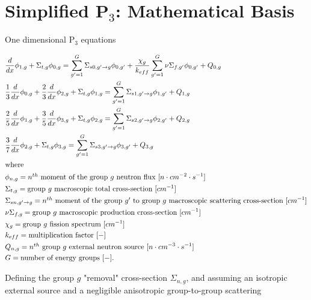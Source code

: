 \documentclass[letterpaper]{article}
\begin{document}
\section{Simplified P$_3$: Mathematical Basis}

One dimensional P$_3$ equations
\cite{brantley_simplifiedP3_2000}

\begin{align}
    & \frac{d}{dx} \phi_{1,g} + \Sigma_{t,g} \phi_{0,g} = \sum_{g'=1}^G \Sigma_{s0,g' \rightarrow g} \phi_{0,g'} + \frac{\chi_g}{k_{eff}} \sum_{g'=1}^G \nu\Sigma_{f,g'} \phi_{0,g'} + Q_{0,g}  \label{eq:SP3-0} \\
    & \frac{1}{3} \frac{d}{dx} \phi_{0,g} + \frac{2}{3}\frac{d}{dx}\phi_{2,g} + \Sigma_{t,g} \phi_{1,g} = \sum_{g'=1}^G \Sigma_{s1,g' \rightarrow g} \phi_{1,g'} + Q_{1,g} \label{eq:SP3-1} \\
    & \frac{2}{5} \frac{d}{dx}\phi_{1,g} + \frac{3}{5}\frac{d}{dx}\phi_{3,g} + \Sigma_{t,g} \phi_{2,g} = \sum_{g'=1}^G \Sigma_{s2,g' \rightarrow g} \phi_{2,g'} + Q_{2,g} \label{eq:SP3-2} \\
    & \frac{3}{7}\frac{d}{dx}\phi_{2,g} + \Sigma_{t,g} \phi_{3,g} = \sum_{g'=1}^G \Sigma_{s3,g' \rightarrow g} \phi_{3,g'} + Q_{3,g} \label{eq:P3-3} \\
    \intertext{where}
    & \phi_{n,g} = \mbox{$n^{th}$ moment of the group $g$ neutron flux } [n \cdot cm^{-2} \cdot s^{-1}]  \notag \\
    & \Sigma_{t,g} = \mbox{group $g$ macroscopic total cross-section } [cm^{-1}]  \notag \\
	& \Sigma_{sn,g' \rightarrow g} = \mbox{$n^{th}$ moment of the group $g'$ to group $g$ macroscopic scattering cross-section } [cm^{-1}]  \notag \\
	& \nu\Sigma_{f,g} = \mbox{group $g$ macroscopic production cross-section } [cm^{-1}]  \notag \\
	& \chi_{g} = \mbox{group $g$ fission spectrum } [cm^{-1}]  \notag \\
	& k_{eff} = \mbox{multiplication factor } [-]  \notag \\
	& Q_{n,g} = \mbox{$n^{th}$ group $g$ external neutron source } [n \cdot cm^{-3} \cdot s^{-1}]  \notag \\
	& G = \mbox{number of energy groups } [-].  \notag
\end{align}

Defining the group $g$ "removal" cross-section $\Sigma_{n,g}$, and assuming an isotropic external source and a negligible anisotropic group-to-group scattering \cite{brantley_simplifiedP3_2000}
\end{document}
